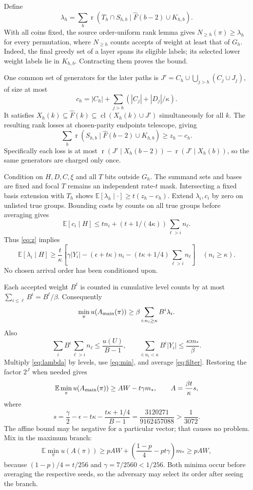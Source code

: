 \documentclass[11pt]{article}
\DeclareMathOperator{\cl}{cl}
\DeclareMathOperator{\rk}{r}
\newcommand{\E}{\mathbb E}
\begin{document}
Define
\[
 \lambda_h=\sum_b\rk(T_h\cap S_{h,b}\mid\widehat F(b-2)\cup K_{h,b}).
\]
With all coins fixed, the source order-uniform rank lemma gives
$N_{\ge h}(\pi)\ge\lambda_h$ for every permutation, where $N_{\ge h}$
counts accepts of weight at least that of $G_h$. Indeed, the final
greedy set of a layer spans its eligible labels; its selected lower
weight labels lie in $K_{h,b}$. Contracting them proves the bound.

One common set of generators for the later paths is
$J'=C_h\cup\bigcup_{j>h}(C_j\cup J_j)$, of size at most
\[
 c_h=|C_h|+\sum_{j>h}(|C_j|+|D_j|/\kappa).
\]
It satisfies $X_h(k)\subseteq\widehat F(k)
\subseteq\cl(X_h(k)\cup J')$ simultaneously for all $k$.
The resulting rank losses at chosen-parity endpoints telescope, giving
\[
 \sum_b\rk(S_{h,b}\mid\widehat F(b-2)\cup K_{h,b})\ge z_h-c_h.
\]
Specifically each loss is at most
$\rk(J'\mid X_h(b-2))-\rk(J'\mid X_h(b))$, so the same generators
are charged only once.

Condition on $H,D,C,\xi$ and all $T$ bits outside $G_h$.
The summand sets and bases are fixed and focal $T$ remains an independent
rate-$t$ mask. Intersecting a fixed basis extension with $T_h$ shows
$\E[\lambda_h\mid\cdot]\ge t(z_h-c_h)$.
Extend $\lambda_i,c_i$ by zero on unlisted true groups. Bounding costs
by counts on all true groups before averaging gives
\[
 \E[c_i\mid H]\le t n_i+(t+1/(4\kappa))\sum_{\ell>i}n_\ell.
\]
Thus \eqref{eq:z} implies
\begin{equation}\label{eq:lambda}
 \E[\lambda_i\mid H]\ge\frac t\kappa
 \left[\gamma|Y_i|-(\epsilon+t\kappa)n_i
              -(t\kappa+1/4)\sum_{\ell>i}n_\ell\right]
 \quad(n_i\ge\kappa).
\end{equation}
No chosen arrival order has been conditioned upon.

Each accepted weight $B^\ell$ is counted in cumulative level counts
by at most $\sum_{i\le\ell}B^i=B^\ell/\beta$. Consequently
\begin{equation}\label{eq:min}
 \min_\pi u(A_{\rm main}(\pi))\ge
 \beta\sum_{i:n_i\ge\kappa}B^i\lambda_i.
\end{equation}
Also
\[
 \sum_iB^i\sum_{\ell>i}n_\ell\le\frac{u(U)}{B-1},\qquad
 \sum_{i:n_i<\kappa}B^i|Y_i|\le\frac{\kappa m_*}{\beta}.
\]
Multiply \eqref{eq:lambda} by levels, use \eqref{eq:min}, and average
\eqref{eq:filter}. Restoring the factor $2^J$ when needed gives
\begin{equation}\label{eq:affine}
 \E\min_\pi u(A_{\rm main}(\pi))\ge AW-t\gamma m_*,\qquad
 A=\frac{\beta t}{\kappa}s,
\end{equation}
where
\begin{equation}\label{eq:slack}
 s=\frac\gamma2-\epsilon-t\kappa-
          \frac{t\kappa+1/4}{B-1}
   =\frac{3120271}{9162457088}>\frac1{3072}.
\end{equation}
The affine bound may be negative for a particular vector; that causes
no problem. Mix in the maximum branch:
\[
 \E\min_\pi u(A(\pi))\ge
 pAW+\left(\frac{1-p}{4}-pt\gamma\right)m_*\ge pAW,
\]
because $(1-p)/4=t/256$ and $\gamma=7/2560<1/256$.
Both minima occur before averaging the respective seeds, so the
adversary may select its order after seeing the branch.
\end{document}
